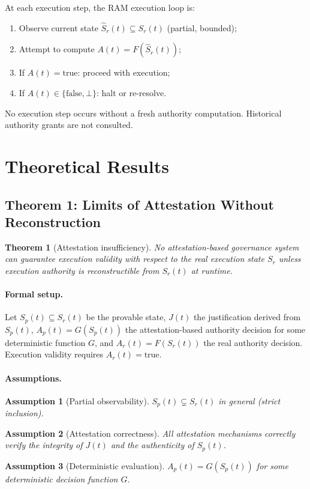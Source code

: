 \documentclass[11pt]{article}
\newtheorem{theorem}{Theorem}[section]
\newtheorem{assumption}{Assumption}[section]
\newcommand{\Sr}{S_r}
\newcommand{\Sp}{S_p}
\newcommand{\Ar}{A_r}
\newcommand{\Ap}{A_p}
\newcommand{\Ndefval}{\bot}
\begin{document}
At each execution step, the RAM execution loop is:

\begin{enumerate}[leftmargin=*, label=(\arabic*)]
  \item Observe current state $\hat{S}_r(t) \subseteq \Sr(t)$ (partial, bounded);
  \item Attempt to compute $A(t) = F(\hat{S}_r(t))$;
  \item If $A(t) = \text{true}$: proceed with execution;
  \item If $A(t) \in \{\text{false}, \Ndefval\}$: halt or re-resolve.
\end{enumerate}

No execution step occurs without a fresh authority computation.
Historical authority grants are not consulted.

\section{Theoretical Results}
\label{sec:theory}

\subsection{Theorem 1: Limits of Attestation Without Reconstruction}

\begin{theorem}[Attestation insufficiency]
\label{thm:attestation-insufficiency}
No attestation-based governance system can guarantee execution validity with
respect to the real execution state $\Sr$ unless execution authority is
reconstructible from $\Sr(t)$ at runtime.
\end{theorem}

\paragraph{Formal setup.}
Let $\Sp(t) \subseteq \Sr(t)$ be the provable state,
$J(t)$ the justification derived from $\Sp(t)$,
$\Ap(t) = G(\Sp(t))$ the attestation-based authority decision for some
deterministic function $G$, and $\Ar(t) = F(\Sr(t))$ the real authority
decision.
Execution validity requires $\Ar(t) = \text{true}$.

\paragraph{Assumptions.}
\begin{assumption}[Partial observability]
$\Sp(t) \subsetneq \Sr(t)$ in general (strict inclusion).
\end{assumption}
\begin{assumption}[Attestation correctness]
All attestation mechanisms correctly verify the integrity of $J(t)$ and the
authenticity of $\Sp(t)$.
\end{assumption}
\begin{assumption}[Deterministic evaluation]
$\Ap(t) = G(\Sp(t))$ for some deterministic decision function $G$.
\end{assumption}
\end{document}
